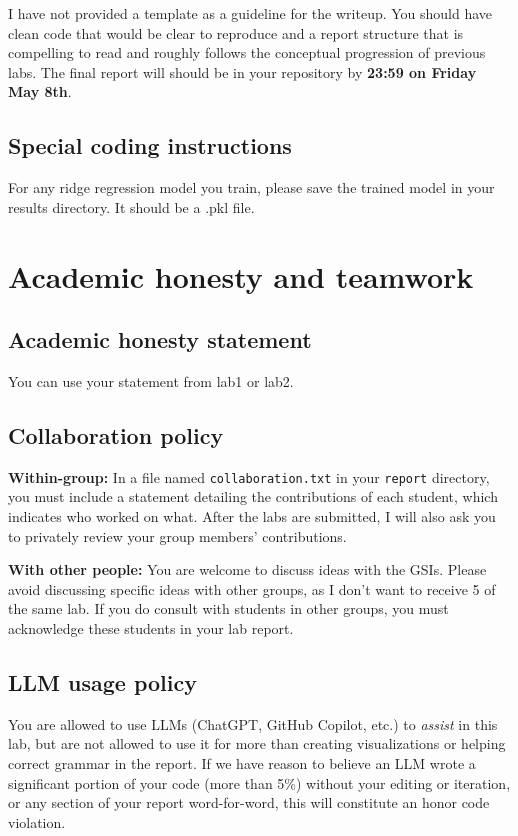 \documentclass[letterpaper,12pt]{article}
\begin{document}
I have not provided a template as a guideline for the writeup. You should have clean code that would be clear to reproduce and a report structure that is compelling to read and roughly follows the conceptual progression of previous labs. The final report will should be in your repository by \textbf{23:59 on Friday May 8th}.

\subsection{Special coding instructions}
For any ridge regression model you train, please save the trained model in your results directory. It should be a .pkl file.

\section{Academic honesty and teamwork}

\subsection{Academic honesty statement}

You can use your statement from lab1 or lab2.

\clearpage
\subsection{Collaboration policy}

\textbf{Within-group:} In a file named \texttt{collaboration.txt} in your \texttt{report} directory, you must include a statement detailing the contributions of each student, which indicates who worked on what. After the labs are submitted, I will also ask you to privately review your group members' contributions.

\textbf{With other people:} You are welcome to discuss ideas with the GSIs. Please avoid discussing specific ideas with other groups, as I don't want to receive 5 of the same lab. If you do consult with students in other groups, you must acknowledge these students in your lab report.

\subsection{LLM usage policy}

You are allowed to use LLMs (ChatGPT, GitHub Copilot, etc.) to \textit{assist} in this lab, but are not allowed to use it for more than creating visualizations or helping correct grammar in the report. If we have reason to believe an LLM wrote a significant portion of your code (more than 5\%) without your editing or iteration, or any section of your report word-for-word, this will constitute an honor code violation.
\end{document}
